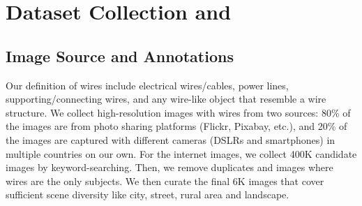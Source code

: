 
\section{Dataset Collection and \benchmark} \label{sec:dataset}

\subsection{Image Source and Annotations}

Our definition of wires include electrical wires/cables, power lines, supporting/connecting wires, and any wire-like object that resemble a wire structure.
We collect high-resolution images with wires from two sources: 80\% of the images are from photo sharing platforms (Flickr, Pixabay, etc.), and 20\% of the images are captured with different cameras (DSLRs and smartphones) in multiple countries on our own. For the internet images, we collect 400K candidate images by keyword-searching. Then, we remove duplicates and images where wires are the only subjects. We then curate the final 6K images that cover sufficient scene diversity like city, street, rural area and landscape.


